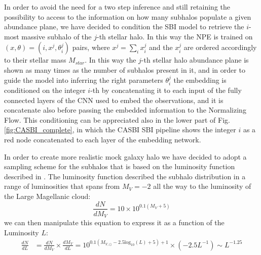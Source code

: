 In order to avoid the need for a two step inference and still retaining the possibility to access to the information on how many subhalos populate a given abundance plane, we have decided to condition the SBI model to retrieve the $i$-most massive subhalo of the $j$-th stellar halo. In this way the NPE is trained on $(x, \theta) = (i, x^j, \theta_i^j)$ pairs, where $x^j = \sum_i x_i^j$ and the $x_i^j$ are ordered accordingly to their stellar mass $M_{star}$. In this way the $j$-th stellar halo abundance plane is shown as many times as the number of subhalos present in it, and in order to guide the model into inferring the right parameters $\theta_i^j$ the embedding is conditioned on the integer $i$-th by concatenating it to each input of the fully connected layers of the CNN used to embed the observations, and it is concatenate also before passing the embedded information to the Normalizing Flow. This conditioning can be appreciated also in the lower part of Fig. \ref{fig:CASBI_complete}, in which the CASBI SBI pipeline shows the integer $i$ as a red node concatenated to each layer of the embedding network. 
            
In order to create more realistic mock galaxy halo we have decided to adopt a sampling scheme for the subhalos that is based on the luminosity function described in \cite{koposovLuminosityFunctionMilky2008}. The luminosity function described the subhalo distribution in a range of luminosities that spans from $M_V = -2$ all the way to the luminosity of the Large Magellanic cloud:
\begin{equation}
    \frac{dN}{d M_V} = 10 \times 10^{0.1(M_V + 5)} 
\end{equation}
we can then manipulate this equation to express it as a function of the Luminosity $L$:
\begin{equation}
\begin{split}
    \frac{dN}{dL} &= \frac{dN}{d M_V} \times \frac{dM_V}{dL} 
    = 10^{0.1(M_{V, \odot} - 2.5\text{log}_{10} (L) +5) +1} \times (-2.5 L^{-1}) \sim L^{-1.25}\\
\end{split}
\end{equation}

